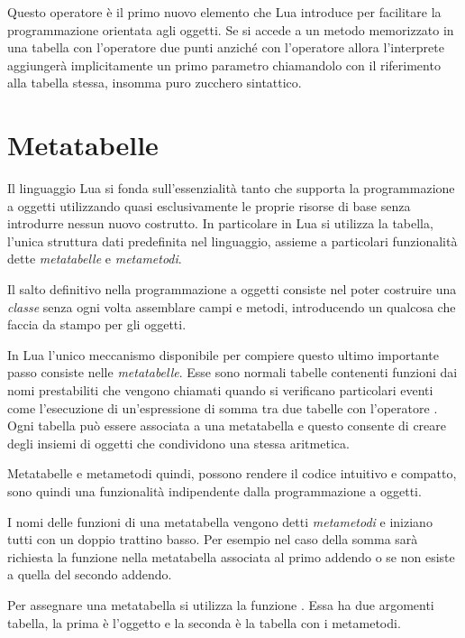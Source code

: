 Questo operatore è il primo nuovo elemento che Lua introduce per facilitare la
programmazione orientata agli oggetti. Se si accede a un metodo memorizzato in
una tabella con l'operatore due punti  anziché con l'operatore
 allora l'interprete aggiungerà implicitamente un primo
parametro chiamandolo  con il riferimento alla tabella
stessa, insomma puro zucchero sintattico.


\section{Metatabelle}

Il linguaggio Lua si fonda sull'essenzialità tanto che supporta la
programmazione a oggetti utilizzando quasi esclusivamente le proprie risorse di
base senza introdurre nessun nuovo costrutto. In particolare in Lua si utilizza
la tabella, l'unica struttura dati predefinita nel linguaggio, assieme a
particolari funzionalità dette \emph{metatabelle} e \emph{metametodi}.

Il salto definitivo nella programmazione a oggetti consiste nel poter costruire
una \emph{classe} senza ogni volta assemblare campi e metodi, introducendo un
qualcosa che faccia da stampo per gli oggetti.

In Lua l'unico meccanismo disponibile per compiere questo ultimo importante
passo consiste nelle \emph{metatabelle}. Esse sono normali tabelle contenenti
funzioni dai nomi prestabiliti che vengono chiamati quando si verificano
particolari eventi come l'esecuzione di un'espressione di somma tra due tabelle
con l'operatore . Ogni tabella può essere associata a una metatabella e
questo consente di creare degli insiemi di oggetti che condividono una stessa
aritmetica.

Metatabelle e metametodi quindi, possono rendere il codice intuitivo e compatto,
sono quindi una funzionalità indipendente dalla programmazione a oggetti.

I nomi delle funzioni di una metatabella vengono detti \emph{metametodi} e
iniziano tutti con un doppio trattino basso. Per esempio nel caso della somma
sarà richiesta la funzione  nella metatabella associata al primo
addendo o se non esiste a quella del secondo addendo.

Per assegnare una metatabella si utilizza la funzione
. Essa ha due argomenti tabella, la prima
è l'oggetto e la seconda è la tabella con i metametodi.


